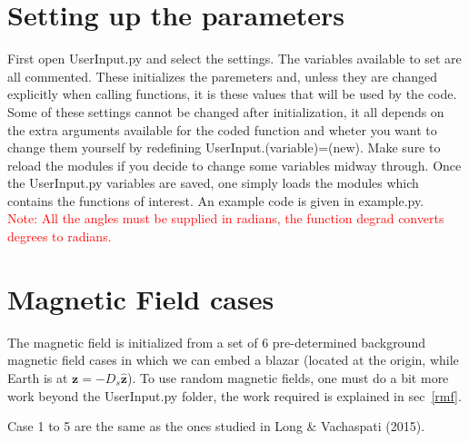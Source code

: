 \documentclass[article, superscriptaddress, ctexart, nofootinbib]{revtex4}
\newcommand{\tcr}{\textcolor{red}}
\begin{document}
\section{Setting up the parameters}
First open UserInput.py and select the settings. The variables available to set are all commented. These initializes the paremeters and, unless they are changed explicitly when calling functions, it is these values that will be used by
the  code. Some of these settings cannot be changed after initialization, it all depends on the extra arguments available for the coded function and wheter you want to change them yourself
by redefining UserInput.(variable)=(new). Make sure to reload the modules if you decide to change some variables midway through. Once the UserInput.py variables are saved, one simply
loads the modules which contains the functions of interest. An example code is given in example.py. \\

\tcr{Note: All the angles must be supplied in radians, the function degrad converts degrees to radians.}\\


\section{Magnetic Field cases}
The magnetic field is initialized from a set of 6 pre-determined background magnetic field cases in which we can embed a blazar (located at the origin, while Earth is at $\bm{z}=-D_s\bm{\hat{z}}$). To use random magnetic fields,
one must do a bit more work beyond the UserInput.py folder, the work required is explained in sec~\ref{rmf}.

Case 1 to 5 are the same as the ones studied in Long \& Vachaspati (2015). \\
\end{document}
